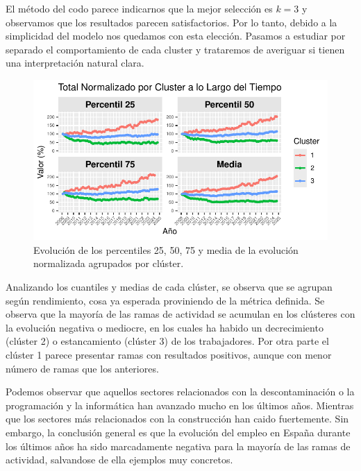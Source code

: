 \documentclass[Universitat de
València,article,submit,moreauthors,pdftex]{Definitions/mdpi}
\begin{document}
El método del codo parece indicarnos que la mejor selección es \(k=3\) y
observamos que los resultados parecen satisfactorios. Por lo tanto,
debido a la simplicidad del modelo nos quedamos con esta elección.
Pasamos a estudiar por separado el comportamiento de cada cluster y
trataremos de averiguar si tienen una interpretación natural clara.

\begin{figure}

{\centering \includegraphics{ProyectoAED2024_files/figure-latex/unnamed-chunk-46-1} 

}

\caption{Evolución de los percentiles 25, 50, 75 y media de la evolución normalizada agrupados por clúster.}\label{fig:unnamed-chunk-46}
\end{figure}

Analizando los cuantiles y medias de cada clúster, se observa que se
agrupan según rendimiento, cosa ya esperada proviniendo de la métrica
definida. Se observa que la mayoría de las ramas de actividad se
acumulan en los clústeres con la evolución negativa o mediocre, en los
cuales ha habido un decrecimiento (clúster 2) o estancamiento (clúster
3) de los trabajadores. Por otra parte el clúster 1 parece presentar
ramas con resultados positivos, aunque con menor número de ramas que los
anteriores.

Podemos observar que aquellos sectores relacionados con la
descontaminación o la programación y la informática han avanzado mucho
en los últimos años. Mientras que los sectores más relacionados con la
construcción han caido fuertemente. Sin embargo, la conclusión general
es que la evolución del empleo en España durante los últimos años ha
sido marcadamente negativa para la mayoría de las ramas de actividad,
salvandose de ella ejemplos muy concretos.
\end{document}
